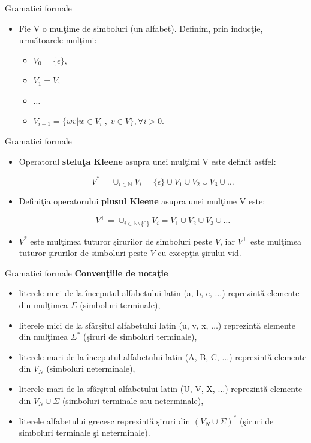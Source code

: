 \documentclass[pdf]{beamer}
\begin{document}
\begin{frame}{Gramatici formale}
\begin{itemize}
\item
Fie V o mulţime de simboluri (un alfabet). Definim, prin inducţie, următoarele mulţimi:
\begin{itemize}
\item
$V_{0} = \{ \epsilon \}$,
\item
$V_{1} = V$,
\item
$\dots$
\item
$V_{i+1} = \{ wv | w \in V_{i} \;, \; v \in V \}, \forall i > 0$.
\end{itemize}
\end{itemize}
\end{frame}



\begin{frame}{Gramatici formale}
\begin{itemize}
\item
Operatorul \textbf{steluţa Kleene} asupra unei mulţimi V este definit astfel:

\[V^{*} = \mathop{ \cup }_{i \in \mathbb{N}} V_{i} = \{ \epsilon \} \cup V_{1} \cup V_{2} \cup V_{3} \cup \dots \]
\item
Definiţia operatorului \textbf{plusul Kleene} asupra unei mulţime V este:

\[V^{+} = \mathop{ \cup }_{i \in \mathbb{N} \setminus \{0\} } V_{i} = V_{1} \cup V_{2} \cup V_{3} \cup \dots \]
\item
$V^{*}$ este mulţimea tuturor şirurilor de simboluri peste $V$, iar $V^{+}$ este mulţimea tuturor şirurilor de simboluri peste $V$ cu excepţia şirului vid.
\end{itemize}
\end{frame}



\begin{frame}{Gramatici formale}
\textbf{Convenţiile de notaţie}
\begin{itemize}
\item
literele mici de la începutul alfabetului latin (a, b, c, $\dots$) reprezintă elemente din mulţimea $\Sigma$ (simboluri terminale),
\item
literele mici de la sfârşitul alfabetului latin (u, v, x, $\dots$) reprezintă elemente din mulţimea $\Sigma^{*}$ (şiruri de simboluri terminale),
\item
literele mari de la începutul alfabetului latin (A, B, C, $\dots$) reprezintă elemente din $V_{N}$ (simboluri neterminale),
\item
literele mari de la sfârşitul alfabetului latin (U, V, X, $\dots$) reprezintă elemente din $V_{N} \cup \Sigma$ (simboluri terminale sau neterminale),
\item
literele alfabetului grecesc reprezintă şiruri din $(V_{N} \cup \Sigma)^{*}$ (şiruri de simboluri terminale şi neterminale).
\end{itemize}
\end{frame}
\end{document}
